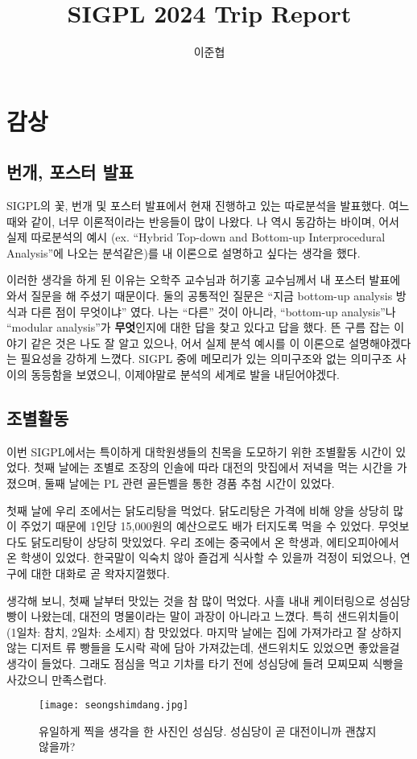 \documentclass{article}
\title{SIGPL 2024 Trip Report}
\author{이준협}
\begin{document}
\maketitle
\section{감상}
\subsection{번개, 포스터 발표}
SIGPL의 꽃, 번개 및 포스터 발표에서 현재 진행하고 있는 따로분석을 발표했다.
여느 때와 같이, 너무 이론적이라는 반응들이 많이 나왔다.
나 역시 동감하는 바이며, 어서 실제 따로분석의 예시 (ex. ``Hybrid Top-down and Bottom-up Interprocedural Analysis''에 나오는 분석같은)를 내 이론으로 설명하고 싶다는 생각을 했다.

이러한 생각을 하게 된 이유는 오학주 교수님과 허기홍 교수님께서 내 포스터 발표에 와서 질문을 해 주셨기 때문이다.
둘의 공통적인 질문은 ``지금 bottom-up analysis 방식과 다른 점이 무엇이냐'' 였다.
나는 ``다른'' 것이 아니라, ``bottom-up analysis''나 ``modular analysis''가 \textbf{무엇}인지에 대한 답을 찾고 있다고 답을 했다.
뜬 구름 잡는 이야기 같은 것은 나도 잘 알고 있으나, 어서 실제 분석 예시를 이 이론으로 설명해야겠다는 필요성을 강하게 느꼈다.
SIGPL 중에 메모리가 있는 의미구조와 없는 의미구조 사이의 동등함을 보였으니, 이제야말로 분석의 세계로 발을 내딛어야겠다.
\subsection{조별활동}
이번 SIGPL에서는 특이하게 대학원생들의 친목을 도모하기 위한 조별활동 시간이 있었다.
첫째 날에는 조별로 조장의 인솔에 따라 대전의 맛집에서 저녁을 먹는 시간을 가졌으며, 둘째 날에는 PL 관련 골든벨을 통한 경품 추첨 시간이 있었다.

첫째 날에 우리 조에서는 닭도리탕을 먹었다.
닭도리탕은 가격에 비해 양을 상당히 많이 주었기 때문에 1인당 15,000원의 예산으로도 배가 터지도록 먹을 수 있었다.
무엇보다도 닭도리탕이 상당히 맛있었다.
우리 조에는 중국에서 온 학생과, 에티오피아에서 온 학생이 있었다.
한국말이 익숙치 않아 즐겁게 식사할 수 있을까 걱정이 되었으나, 연구에 대한 대화로 곧 왁자지껄했다.

생각해 보니, 첫째 날부터 맛있는 것을 참 많이 먹었다.
사흘 내내 케이터링으로 성심당 빵이 나왔는데, 대전의 명물이라는 말이 과장이 아니라고 느꼈다.
특히 샌드위치들이 (1일차: 참치, 2일차: 소세지) 참 맛있었다.
마지막 날에는 집에 가져가라고 잘 상하지 않는 디저트 류 빵들을 도시락 곽에 담아 가져갔는데, 샌드위치도 있었으면 좋았을걸 생각이 들었다.
그래도 점심을 먹고 기차를 타기 전에 성심당에 들려 모찌모찌 식빵을 사갔으니 만족스럽다.
\begin{figure}[h!]
  \centering
  \texttt{[image: seongshimdang.jpg]}
  \caption{유일하게 찍을 생각을 한 사진인 성심당. 성심당이 곧 대전이니까 괜찮지 않을까?}
\end{figure}
\end{document}
